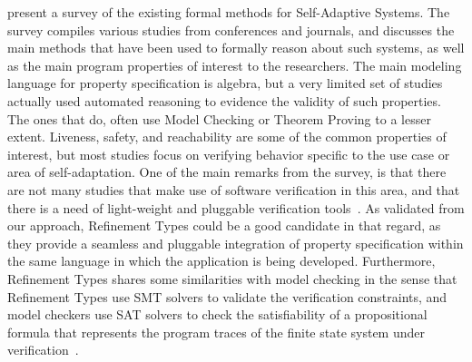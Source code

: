 \citet{weyns12} present a survey of the existing formal methods for Self-Adaptive Systems. The 
survey compiles various studies from conferences and journals, and discusses the main methods that 
have been used to formally reason about such systems, as well as the main program properties of 
interest to the researchers.
The main modeling language for property specification is algebra, but a very limited set of studies 
actually used automated reasoning to evidence the validity of such properties. The ones that do, often 
use Model Checking or Theorem Proving to a lesser extent. Liveness, safety, and reachability are 
some of the common properties of interest, but most studies focus on verifying behavior specific to the 
use case or area of self-adaptation.
One of the main remarks from the survey, is that there are not many studies that make use of software 
verification in this area, and that there is a need of light-weight and pluggable verification 
tools~\cite{weyns12}. As validated from our approach, Refinement Types could be a good candidate in 
that regard, as they provide a seamless and pluggable integration of property specification within the 
same language in which the application is being developed.
Furthermore, Refinement Types shares some similarities with model checking in the sense that 
Refinement Types use \ac{SMT} solvers to validate the verification constraints, and model checkers 
use SAT solvers to check the satisfiability of a propositional formula that represents the program 
traces of the finite state system under verification~\cite{armando06}.


\endinput

